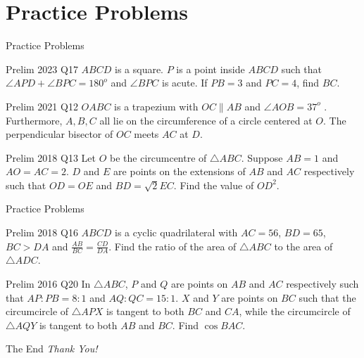 \documentclass{beamer}
\begin{document}
\section{Practice Problems}
\begin{frame}{Practice Problems}
	\begin{block}{Prelim 2023 Q17}
		$ABCD$ is a square. $P$ is a point inside $ABCD$ such that $\angle APD + \angle BPC = 180^o$ and  $\angle BPC$ is acute.  If $PB = 3$ and $PC = 4$, find $BC$.
	\end{block}
	\begin{block}{Prelim 2021 Q12}
		$OABC$ is a trapezium with $OC \parallel AB$ and $\angle AOB = 37^o$	. Furthermore, $A,B,C$ all lie on the circumference of a circle centered at $O$. The perpendicular bisector of $OC$ meets $AC$ at $D$.
	\end{block}
	\begin{block}{Prelim 2018 Q13}
		Let $O$ be the circumcentre of $\triangle ABC$. Suppose $AB = 1$ and $AO = AC = 2$. $D$ and $E$ are points on the extensions of $AB$ and $A C$ respectively such that $OD = OE $ and $BD = \sqrt{2} EC$. Find the value of $OD^2$.
	\end{block}
\end{frame}
\begin{frame}{Practice Problems}
	\begin{block} {Prelim 2018 Q16}
		$ABCD$ is a cyclic quadrilateral with $AC=56$, $BD=65$, $BC>DA$ and $\frac{AB}{BC} = \frac{CD}{DA}$. Find the ratio of the area of $\triangle ABC$ to the area of $\triangle ADC$.
	\end{block}
	\begin{block} {Prelim 2016 Q20}
		In $\triangle ABC$, $P$ and $Q$ are points on $AB$ and $AC$ respectively such that $AP:PB=8:1$ and $AQ:QC=15:1$.  $X$ and $Y$ are points on $BC$ such that the circumcircle of $\triangle APX$ is tangent to both $BC$ and $CA$, while the circumcircle of  $\triangle AQY$ is tangent to both $AB$ and $BC$. Find $\cos BAC$.
	\end{block}
\end{frame}

\begin{frame}{The End}
	\centering \Large
	\emph{Thank You!}
\end{frame}
\end{document}

